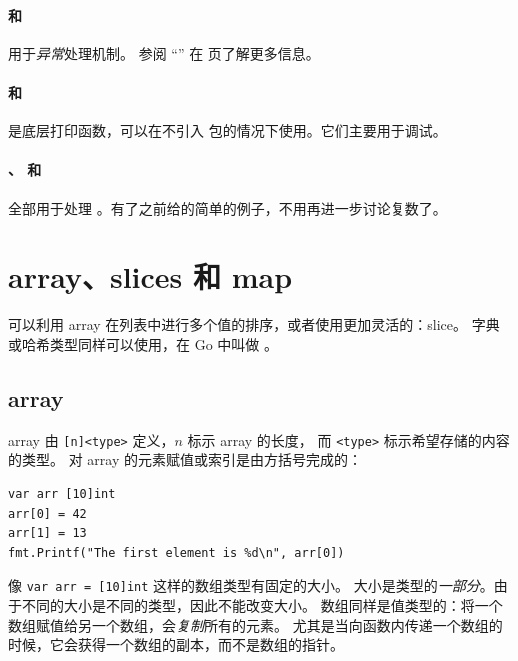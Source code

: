 \paragraph{ 和 } 用于\emph{异常}处理机制。
参阅 ``'' 在 \pageref{sec:panic} 页了解更多信息。

\paragraph{ 和 } 是底层打印函数，可以在不引入
 包的情况下使用。它们主要用于调试。

\paragraph{、 和 } 全部用于处理
。有了之前给的简单的例子，不用再进一步讨论复数了。


\section{array、slices 和 map}
\label{sec:arrays}
可以利用 array 在列表中进行多个值的排序，或者使用更加灵活的：slice。
字典或哈希类型同样可以使用，在 Go 中叫做 。

\subsection{array}
array 由 \verb|[n]<type>| 定义，$n$ 标示 array 的长度，
而 \verb|<type>| 标示希望存储的内容的类型。
对 array 的元素赋值或索引是由方括号完成的：
\begin{lstlisting}
var arr [10]int
arr[0] = 42
arr[1] = 13
fmt.Printf("The first element is %d\n", arr[0])
\end{lstlisting}
像 \lstinline{var arr = [10]int} 这样的数组类型有固定的大小。
大小是类型的\emph{一部分}。由于不同的大小是不同的类型，因此不能改变大小。
数组同样是值类型的：将一个数组赋值给另一个数组，会\emph{复制}所有的元素。
尤其是当向函数内传递一个数组的时候，它会获得一个数组的副本，而不是数组的指针。

